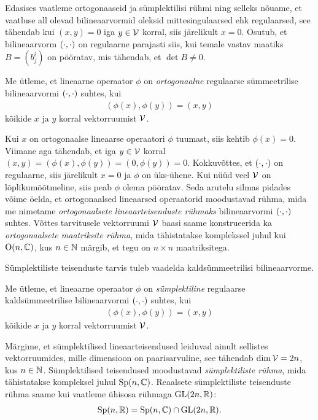 Edasises vaatleme ortogonaaseid ja sümplektilisi rühmi ning selleks
nõuame, et vaatluse all olevad bilineaarvormid oleksid mittesingulaarsed
ehk regulaarsed, see tähendab kui $(x, y) = 0$ iga $y \in \mathcal{V}$ korral, siis
järelikult $x = 0$. Osutub, et bilineaarvorm $\left( \cdot, \cdot \right)$ on regulaarne parajasti
siis, kui temale vastav maatiks $B = (b^i_j)$ on pööratav, mis tähendab,
et $\det B \neq 0$.

\begin{dfn}
    Me ütleme, et lineaarne operaator $\phi$ on \emph{ortogonaalne}
    regulaarse sümmeetrilise bilineaarvormi $\left( \cdot, \cdot \right)$ suhtes, kui
    \begin{align*}
        (\phi(x), \phi(y)) = (x, y)
    \end{align*}
    kõikide $x$ ja $y$ korral vektorruumist $\mathcal{V}$.
\end{dfn}

Kui $x$ on ortogonaalse lineaarse operaatori $\phi$ tuumast, siis
kehtib $\phi(x) = 0$. Viimane aga tähendab, et iga $y \in \mathcal{V}$ korral
$(x, y) = (\phi(x), \phi(y)) = (0, \phi(y)) = 0$. Kokkuvõttes,
et $\left( \cdot, \cdot \right)$ on regulaarne, siis järelikult $x = 0$ ja $\phi$ on üks-ühene.
Kui nüüd veel $\mathcal{V}$ on lõplikumõõtmeline, siis peab $\phi$ olema pööratav.
Seda arutelu silmas pidades võime öelda, et ortogonaalsed lineaarsed
operaatorid moodustavad rühma, mida me nimetame \emph{ortogonaalsete
lineaarteisenduste rühmaks} bilineaarvormi $\left( \cdot, \cdot \right)$ suhtes.
Võttes tarvitusele vektorruumi $\mathcal{V}$ baasi saame konstrueerida ka
\emph{ortogonaalsete maatriksite rühma}, mida tähistatakse komplekssel juhul
kui $\operatorname{O}(n, \mathbb{C})$, kus $n \in \mathbb{N}$ märgib, et tegu on $n \times n$ maatriksitega.

Sümplektiliste teisenduste tarvis tuleb vaadelda kaldsümmeetrilisi
bilineaarvorme.

\begin{dfn}
    Me ütleme, et lineaarne operaator $\phi$ on \emph{sümplektiline}
    regulaarse kaldsümmeetrilise bilineaarvormi $\left( \cdot, \cdot \right)$ suhtes, kui
    \begin{align*}
        (\phi(x), \phi(y)) = (x, y)
    \end{align*}
    kõikide $x$ ja $y$ korral vektorruumist $\mathcal{V}$.
\end{dfn}

Märgime, et sümplektilised lineaarteisendused leiduvad ainult sellistes
vektorruumides, mille dimensioon on paarisarvuline, see tähendab
$\dim \mathcal{V} = 2n$, kus $n \in \mathbb{N}$. Sümplektilised teisendused moodustavad
\emph{sümplektiliste rühma}, mida tähistatakse kompleksel juhul
$\operatorname{Sp}(n, \mathbb{C})$. Reaalsete sümplektiliste
teisenduste rühma saame kui vaatleme ühisosa rühmaga $\operatorname{GL}(2n, \mathbb{R})$:
\begin{align*}
    \operatorname{Sp}(n, \mathbb{R}) = \operatorname{Sp}(n, \mathbb{C}) \cap \operatorname{GL}(2n, \mathbb{R}).
\end{align*}

